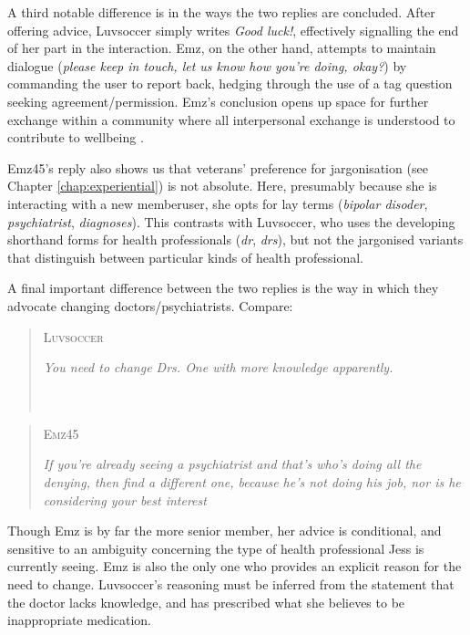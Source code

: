 \documentclass{article}
\begin{document}
A third notable difference is in the ways the two replies are concluded. After offering advice, Luvsoccer simply writes \emph{Good luck!}, effectively signalling the end of her part in the interaction. Emz, on the other hand, attempts to maintain dialogue (\emph{please keep in touch, let us know how you're doing, okay?}) by commanding the user to report back, hedging through the use of a tag question seeking agreement\slash permission. Emz's conclusion opens up space for further exchange within a community where all interpersonal exchange is understood to contribute to wellbeing \parencite[c.f.][]{althoff_counseling_2016}.%

Emz45's reply also shows us that veterans' preference for jargonisation (see Chapter \ref{chap:experiential}) is not absolute. Here, presumably because she is interacting with a new member{user}, she opts for lay terms (\emph{bipolar disoder}, \emph{psychiatrist}, \emph{diagnoses}). This contrasts with Luvsoccer, who uses the developing shorthand forms for health professionals (\emph{dr}, \emph{drs}), but not the jargonised variants that distinguish between particular kinds of health professional.

A final important difference between the two replies is the way in which they advocate changing doctors\slash psychiatrists. Compare:

\begin{multicols}{2}
\begin{quote}
\textsc{Luvsoccer}

\emph{You need to change Drs. One with more knowledge apparently.} ~\\~\\~\\
\end{quote}

\begin{quote}
\textsc{Emz45}

\emph{If you're already seeing a psychiatrist and that's who's doing all the denying, then find a different one, because he's not doing his job, nor is he considering your best interest}
\end{quote}
\end{multicols}
%
\noindent Though Emz is by far the more senior member, her advice is conditional, and sensitive to an ambiguity concerning the type of health professional Jess is currently seeing. Emz is also the only one who provides an explicit reason for the need to change. Luvsoccer's reasoning must be inferred from the statement that the doctor lacks knowledge, and has prescribed what she believes to be inappropriate medication. 
\end{document}

